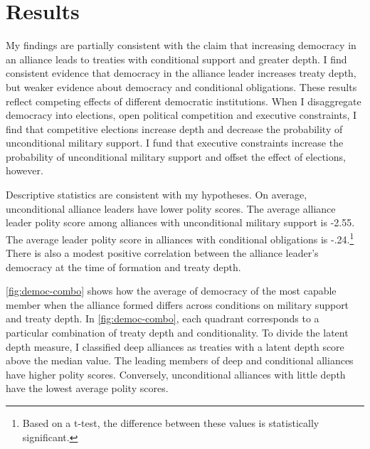 \documentclass[12pt]{article}
\begin{document}
\section{Results}


My findings are partially consistent with the claim that increasing democracy in an alliance leads to treaties with conditional support and greater depth. 
I find consistent evidence that democracy in the alliance leader increases treaty depth, but weaker evidence about democracy and conditional obligations. 
These results reflect competing effects of different democratic institutions. 
When I disaggregate democracy into elections, open political competition and executive constraints, I find that competitive elections increase depth and decrease the probability of unconditional military support.
I fund that executive constraints increase the probability of unconditional military support and offset the effect of elections, however. 


Descriptive statistics are consistent with my hypotheses.
On average, unconditional alliance leaders have lower polity scores.
The average alliance leader polity score among alliances with unconditional military support is -2.55. 
The average leader polity score in alliances with conditional obligations is -.24.\footnote{Based on a t-test, the difference between these values is statistically significant.} 
There is also a modest positive correlation between the alliance leader's democracy at the time of formation and treaty depth. 


\autoref{fig:democ-combo} shows how the average of democracy of the most capable member when the alliance formed differs across conditions on military support and treaty depth.
In \autoref{fig:democ-combo}, each quadrant corresponds to a particular combination of treaty depth and conditionality. 
To divide the latent depth measure, I classified deep alliances as treaties with a latent depth score above the median value. 
The leading members of deep and conditional alliances have higher polity scores. 
Conversely, unconditional alliances with little depth have the lowest average polity scores. 
\end{document}

